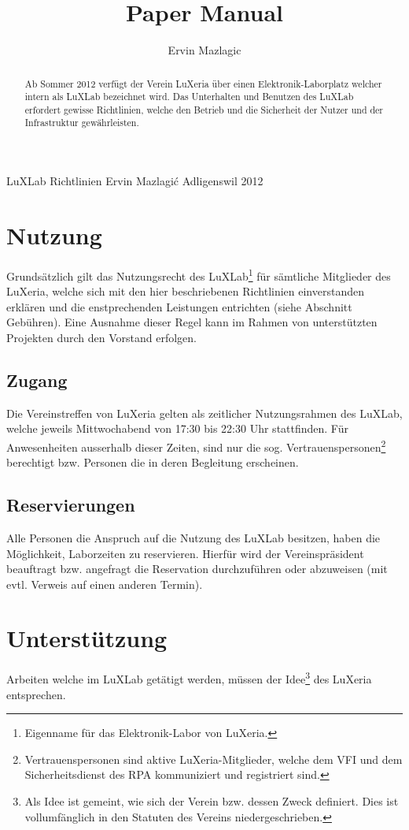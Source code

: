 \documentclass[a4paper,
               10pt,
               fleqn]{article}
\author{Ervin Mazlagic}
\title{Paper Manual}
\begin{document}
         {LuXLab Richtlinien}
         {Ervin Mazlagi\'c}
         {Adligenswil}
         {2012}
         
\begin{abstract}
\noindent
Ab Sommer 2012 verfügt der Verein LuXeria über einen Elektronik-Laborplatz
welcher intern als LuXLab bezeichnet wird. Das Unterhalten und Benutzen 
des LuXLab erfordert gewisse Richtlinien, welche den Betrieb und
die Sicherheit der Nutzer und der Infrastruktur gewährleisten.
\end{abstract}

\newpage

\tableofcontents
\newpage


\section{Nutzung}
Grundsätzlich gilt das Nutzungsrecht des LuXLab\footnote{
    Eigenname für das Elektronik-Labor von LuXeria.} 
für sämtliche Mitglieder des LuXeria, welche sich mit den hier beschriebenen Richtlinien 
einverstanden erklären und die enstprechenden Leistungen entrichten 
(siehe Abschnitt Gebühren). Eine Ausnahme dieser Regel kann im Rahmen 
von unterstützten Projekten durch den Vorstand erfolgen.

\subsection{Zugang}
Die Vereinstreffen von LuXeria gelten als zeitlicher Nutzungsrahmen 
des LuXLab, welche jeweils Mittwochabend von 17:30 bis 22:30 Uhr 
stattfinden. Für Anwesenheiten ausserhalb dieser Zeiten, sind nur die sog. Vertrauenspersonen\footnote{Vertrauenspersonen sind aktive LuXeria-Mitglieder,
    welche dem VFI und dem Sicherheitsdienst des
    RPA kommuniziert und registriert sind.}
berechtigt bzw. Personen die in deren Begleitung erscheinen.

\subsection{Reservierungen}
Alle Personen die Anspruch auf die Nutzung des LuXLab besitzen, haben die
Möglichkeit, Laborzeiten zu reservieren. Hierfür wird der Vereinspräsident 
beauftragt bzw. angefragt die Reservation durchzuführen oder abzuweisen
(mit evtl. Verweis auf einen anderen Termin).

\section{Unterstützung}
Arbeiten welche im LuXLab getätigt werden, müssen der Idee\footnote{
     Als Idee ist gemeint, wie sich der Verein bzw. dessen Zweck definiert.
     Dies ist vollumfänglich in den Statuten des Vereins niedergeschrieben.}
des LuXeria entsprechen. 
\end{document}
